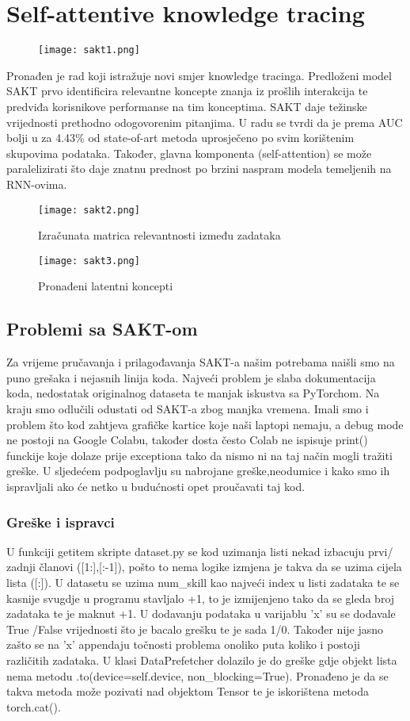 
\chapter{Self-attentive knowledge tracing}
	\begin{figure}[!htb]
		\centering
		\texttt{[image: sakt1.png]}
		\caption{}
		\label{}
	\end{figure}
	Pronađen je rad koji istražuje novi smjer knowledge tracinga. Predloženi model SAKT prvo identificira relevantne koncepte znanja iz prošlih interakcija te predviđa korisnikove performanse na tim konceptima. SAKT daje težinske vrijednosti prethodno odogovorenim pitanjima. U radu se tvrdi da je prema AUC bolji u za 4.43\% od state-of-art metoda uprosječeno po svim korištenim skupovima podataka. Također, glavna komponenta (self-attention) se može paralelizirati što daje znatnu prednost po brzini naspram modela temeljenih na RNN-ovima.

		\begin{figure}[H]
		\centering
		\texttt{[image: sakt2.png]}
		\caption{Izračunata matrica relevantnosti između zadataka}
		\label{}
	\end{figure}
	\begin{figure}[!htb]
	\centering
	\texttt{[image: sakt3.png]}
	\caption{Pronađeni latentni koncepti}
	\label{}
\end{figure}
	\section{Problemi sa SAKT-om}
	Za vrijeme pručavanja i prilagođavanja SAKT-a našim potrebama naišli smo na puno grešaka i nejasnih linija koda. Najveći problem je slaba dokumentacija koda, nedostatak originalnog dataseta te manjak iskustva sa PyTorchom.
	Na kraju smo odlučili odustati od SAKT-a zbog manjka vremena. Imali smo i problem što kod zahtjeva grafičke kartice koje naši laptopi nemaju, a debug mode ne postoji na Google Colabu, također dosta često Colab ne ispisuje print() funckije koje dolaze prije exceptiona tako da nismo ni na taj način mogli tražiti greške. U sljedećem podpoglavlju su nabrojane greške,neodumice i kako smo ih ispravljali ako će netko u budućnosti opet proučavati taj kod.
	\subsection{Greške i ispravci}
	
		U funkciji getitem skripte dataset.py se kod uzimanja listi nekad izbacuju prvi/ zadnji članovi ([1:],[:-1]), pošto to nema logike izmjena je takva da se uzima cijela lista ([:]). U datasetu se uzima num\_skill kao najveći index u listi zadataka te se kasnije svugdje u programu stavljalo +1, to je izmijenjeno tako da se gleda broj zadataka te je maknut +1. U dodavanju podataka u varijablu 'x' su se dodavale True /False vrijednosti što je bacalo grešku te je sada 1/0. Također nije jasno zašto se na 'x' appendaju točnosti problema onoliko puta koliko i postoji različitih zadataka. U klasi DataPrefetcher dolazilo je do greške gdje objekt lista nema metodu .to(device=self.device, non\_blocking=True). Pronađeno je da se takva metoda može pozivati nad objektom Tensor te je iskorištena metoda torch.cat().
		
